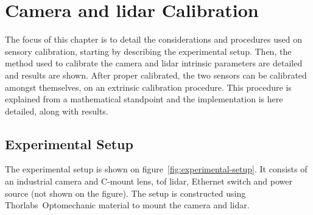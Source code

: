 \chapter{Camera and \acs{lidar} Calibration}
\label{chapter:calibration}

The focus of this chapter is to detail the considerations and procedures used on sensory calibration, starting by describing the experimental setup. Then, the method used to calibrate the camera and \ac{lidar} intrinsic parameters are detailed and results are shown. After proper calibrated, the two sensors can be calibrated amongst themselves, on an extrinsic calibration procedure. This procedure is explained from a mathematical standpoint and the implementation is here detailed, along with results.


\section{Experimental Setup}
The experimental setup is shown on figure~\ref{fig:experimental-setup}. It consists of an industrial camera and C-mount lens, \ac{tof} \ac{lidar}, Ethernet switch and power source (not shown on the figure). The setup is constructed using Thorlabs\cp~Optomechanic material to mount the camera and \ac{lidar}.

